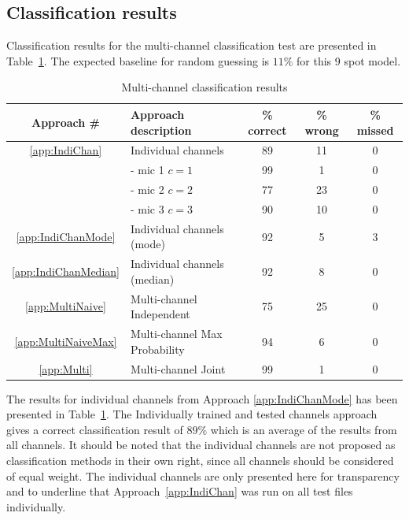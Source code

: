 \subsection{Classification results}\label{sec:MultiAPRResultsClass}
Classification results for the multi-channel classification test are presented in Table~\ref{tab:multiAPRresults}. The expected baseline for random guessing is $11 \%$ for this 9 spot model.
\begin{table}\begin{center}
\caption{Multi-channel classification results}
\label{tab:multiAPRresults}
\begin{tabular}{|c|l|c|c|c|}\hline
Approach \#             & Approach description          & \% correct    & \% wrong  & \% missed  \\ \hline
\ref{app:IndiChan}      & Individual channels           & 89            & 11        & 0          \\
                        &  - mic 1 $c = 1$              & 99            & 1         & 0          \\
                        &  - mic 2 $c = 2$              & 77            & 23        & 0          \\
                        &  - mic 3 $c = 3$              & 90            & 10        & 0          \\
\ref{app:IndiChanMode}  & Individual channels (mode)    & 92            & 5         & 3          \\
\ref{app:IndiChanMedian}& Individual channels (median)  & 92            & 8         & 0          \\
\ref{app:MultiNaive}    & Multi-channel Independent     & 75            & 25        & 0          \\
\ref{app:MultiNaiveMax} & Multi-channel Max Probability & 94            & 6         & 0          \\
\ref{app:Multi}         & Multi-channel Joint           & 99            & 1         & 0          \\ \hline
\end{tabular}\end{center}\end{table}

The results for individual channels from Approach \ref{app:IndiChanMode} has been presented in Table~\ref{tab:multiAPRresults}. The Individually trained and tested channels approach gives a correct classification result of $89\%$ which is an average of the results from all channels. It should be noted that the individual channels are not proposed as classification methods in their own right, since all channels should be considered of equal weight. The individual channels are only presented here for transparency and to underline that Approach~\ref{app:IndiChan} was run on all test files individually.

